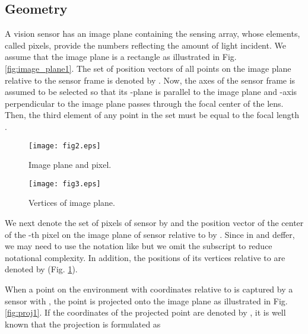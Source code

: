 \documentclass[conference,letterpaper]{ieeeconf}
\begin{document}
\subsection{Geometry}






A vision sensor has an image plane containing the sensing array, 
whose elements, called pixels, 
provide the numbers reflecting 
the amount of light incident.
We assume that the image plane is a rectangle as illustrated in Fig. \ref{fig:image_plane1}.
The set of position vectors of all points on the image plane relative to the sensor frame 
is denoted by . 
Now, the axes of the sensor frame  is assumed to be selected 
so that its -plane is parallel to the image plane
and -axis perpendicular to the image plane passes through 
the focal center of the lens.
Then, the third element of any point in the set  
must be equal to the focal length
.


\begin{figure}[t]
\begin{center}
\begin{minipage}{4cm}
\begin{center}
\texttt{[image: fig2.eps]}
\caption{Image plane and pixel.}
\label{fig:image_plane1}
\end{center}
\end{minipage}
\hspace{.2cm}
\begin{minipage}{4cm}
\begin{center}
\texttt{[image: fig3.eps]}
\caption{Vertices of image plane.}
\label{fig:image_plane2}
\end{center}
\end{minipage}
\end{center}
\end{figure}






We next denote the set of pixels of sensor  by  and
the position vector of the center of the -th pixel on the image plane of sensor 
relative to  by .
Since  in  and  deffer,
we may need to use the notation like  but we omit the subscript
to reduce notational complexity.
In addition, the positions of its vertices relative to 
 are denoted by 
(Fig. \ref{fig:image_plane2}).



When a point on the environment with coordinates  relative to 
is captured by a sensor  with ,
the point is projected onto the image plane as illustrated in
Fig. \ref{fig:proj1}.
If the coordinates of the projected point 
are denoted by ,
it is well known that the projection is formulated as
\end{document}
